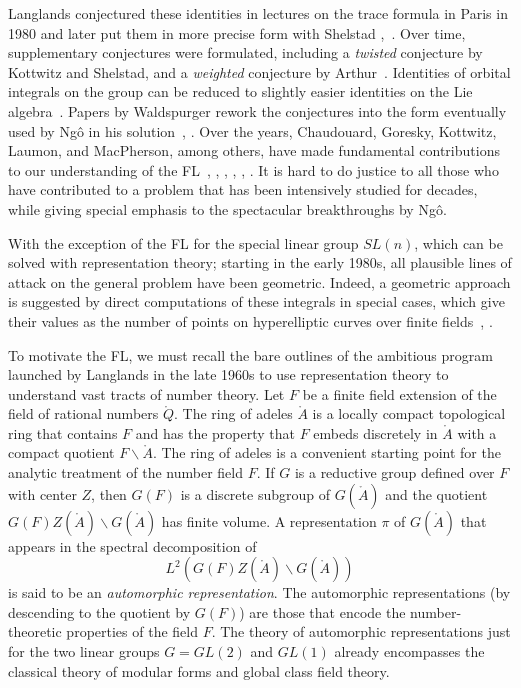 Langlands conjectured these identities in lectures on the trace
formula in Paris in 1980 and later put them in more precise form with
Shelstad \cite{Langlands:debuts},~\cite{LS:1987}.  Over time,
supplementary conjectures were formulated, including a {\it twisted}
conjecture by Kottwitz and Shelstad, and a {\it weighted} conjecture
by Arthur~\cite{KS:1999}.  Identities of orbital integrals on the
group can be reduced to slightly easier identities on the Lie
algebra~\cite{LS:1990}.  Papers by Waldspurger rework the conjectures
into the form eventually used by Ng\^o in his
solution~\cite{Wald:2008},  \cite{Wald:1991}.  Over
the years, Chaudouard, Goresky, Kottwitz, Laumon, and MacPherson,
among others, have made fundamental contributions to our understanding
of the FL~\cite{LN:08}, \cite{GKM:2004}, \cite{GKM:2006},
\cite{CL:2009:I}, \cite{CL:2009:II}, \cite{CHL:2010}.  It is hard to do justice to all
those who have contributed to a problem that has been intensively
studied for decades, while giving special emphasis to the spectacular
breakthroughs by Ng\^o.


With the exception of the FL for the special linear group $SL(n)$,
which can be solved with representation theory; starting in the early
1980s, all plausible lines of attack on the general problem have been
geometric.  Indeed, a geometric approach is suggested by direct 
computations of these integrals in special cases, which
give their values as the number of points on hyperelliptic curves
over finite fields~\cite{KL:1988}, \cite{Hales:hyperelliptic}.

To motivate the FL, we must recall the bare outlines of the ambitious
program launched by Langlands in the late 1960s to use representation
theory to understand vast tracts of number theory.  Let $F$ be a
finite field extension of the field of rational numbers $\ring{Q}$.
The ring of adeles $\ring{A}$ is a locally compact topological ring
that contains $F$ and has the property that $F$ embeds discretely in
$\ring{A}$ with a compact quotient $F\backslash\ring{A}$.  The ring of
adeles is a convenient starting point for the analytic treatment of the
number field $F$.  If $G$ is a reductive group defined over $F$ with
center $Z$, then $G(F)$ is a discrete subgroup of $G(\ring{A})$ and
the quotient $G(F)Z(\ring{A})\backslash G(\ring{A})$ has finite
volume.  A representation $\pi$ of $G(\ring{A})$ that
appears in the spectral decomposition of
\[
L^2(G(F)Z(\ring{A})\backslash G(\ring{A}))
\]
is said to be an {\it automorphic representation}.  The automorphic
representations (by descending to the quotient by $G(F)$) are those
that encode the number-theoretic properties of the field $F$.
The theory of automorphic representations just for the two linear
groups $G=GL(2)$ and $GL(1)$ already 
encompasses the classical theory
of modular forms and global class field theory.

